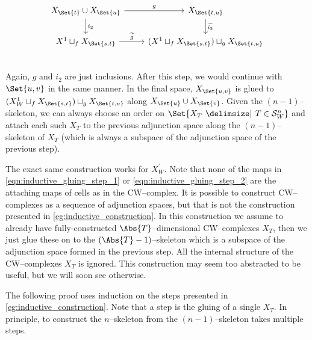 \documentclass[class=article, crop=false]{standalone}
\begin{document}
\begin{example}
    \begin{equation}
        \begin{tikzcd}
                X_{{\Set{t}}} \cup X_{{\Set{u}}} \ar[r, "g" ] \ar[d, "i_2"]   &  X_{{\Set{t,u}}}   \ar[d, "\widetilde{i_2}"]    \\
                X^1 \sqcup_f X_{{\Set{s,t}}} \ar[r, "\widetilde{g}"]            &   (X^1 \sqcup_f X_{{\Set{s,t}}}) \sqcup_g X_{{\Set{t,u}}}            \\
        \end{tikzcd}
        \label{eqn:inductive_gluing_step_2}
    \end{equation}
    Again, $g$ and $i_2$ are just inclusions. After this step, we would continue with $\Set{u,v}$ in the same manner. In the final space, $X_{\Set{u,v}}$ is glued to $(X^1_W \sqcup_f X_{\Set{s,t}}) \sqcup_g X_{\Set{t,u}}$ along $X_{\Set{u}} \cup X_{\Set{v}}$. Given the $(n-1)$--skeleton, we can always choose an order on $\Set{X_{T} \given T \in \mathcal{S}^n_W}$ and attach each such $X_{T}$ to the previous adjunction space along the $(n-1)$--skeleton of $X_{T}$ (which is always a subspace of the adjunction space of the previous step).
\end{example}

The exact same construction works for $X^\prime_W$. Note that none of the maps in \eqref{eqn:inductive_gluing_step_1} or \eqref{eqn:inductive_gluing_step_2} are the attaching maps of cells as in the CW--complex. It is possible to construct CW--complexes as a sequence of adjunction spaces, but that is not the construction presented in \cref{eg:inductive_construction}. In this construction we assume to already have fully-constructed $\Abs{T}$--dimensional CW--complexes $X_T$, then we just glue these on to the $(\Abs{T}-1)$--skeleton which is a subspace of the adjunction space formed in the previous step. All the internal structure of the CW--complexes $X_T$ is ignored. This construction may seem too abstracted to be useful, but we will soon see otherwise.

The following proof uses induction on the steps presented in \cref{eg:inductive_construction}. Note that a step is the gluing of a single $X_T$. In principle, to construct the $n$--skeleton from the $(n-1)$--skeleton takes multiple steps.
\end{document}
